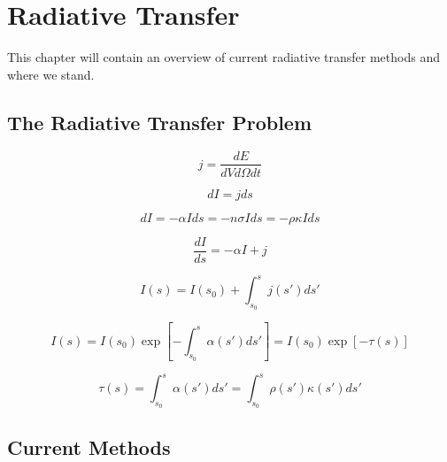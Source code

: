 \pagestyle{fancy}
\headheight 20pt
\chead{}
\lfoot{}
\cfoot{\thepage}
\rfoot{}
\renewcommand{\headrulewidth}{0.1pt}
\renewcommand{\footrulewidth}{0.1pt}

\chapter{Radiative Transfer}
\label{chap:radtransfer}

\thispagestyle{fancy}

This chapter will contain an overview of current radiative transfer methods and where we stand.

\section{The Radiative Transfer Problem}
\label{sec:rtformulation}


\begin{equation}
\label{eq:emissioncoef}
j = \frac{dE}{dV d\Omega dt}
\end{equation}

\begin{equation}
\label{eq:intensity}
dI = j ds
\end{equation}

\begin{equation}
\label{eq:absorption}
dI = -\alpha I ds = -n \sigma I ds = -\rho \kappa I ds
\end{equation}

\begin{equation}
\label{eq:radtransfer}
\frac{dI}{ds} = -\alpha I +j
\end{equation}

\begin{equation}
\label{eq:rademission}
I(s) = I(s_0) + \int_{s_0}^{s} j(s') ds'
\end{equation}

\begin{equation}
\label{eq:radabsorption}
I(s) = I(s_0)\exp{\left[-\int_{s_0}^{s} \alpha(s') ds'\right]} = I(s_0)\exp{\left[ -\tau (s) \right]}
\end{equation}

\begin{equation}
\label{eq:opticaldepth}
\tau(s) = \int_{s_0}^{s} \alpha (s') ds' = \int_{s_0}^{s} \rho (s') \kappa(s') ds'
\end{equation}

\section{Current Methods}
\label{sec:currentmethods}

